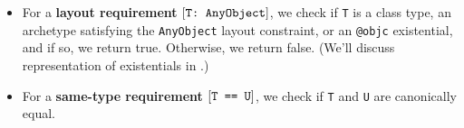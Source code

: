 \documentclass[../generics]{subfiles}
\begin{document}
\begin{algorithm}
\begin{itemize}
\begin{enumerate}
\end{enumerate}
\item For a \textbf{layout requirement} $[\texttt{T:~AnyObject}]$, we check if \texttt{T} is a class type, an archetype satisfying the \texttt{AnyObject} layout constraint, or an \texttt{@objc} existential, and if so, we return true. Otherwise, we return false. (We'll discuss representation of existentials in .)
\item For a \textbf{same-type requirement} $[\texttt{T == U}]$, we check if \texttt{T} and \texttt{U} are canonically equal.
\end{itemize}
\end{algorithm}
\end{document}

